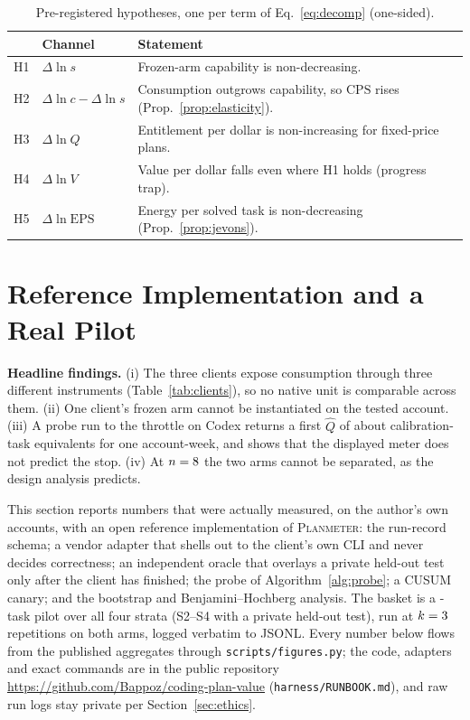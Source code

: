 \documentclass[conference]{IEEEtran}
\theoremstyle{plain}
\theoremstyle{definition}
\newcommand{\CPS}{\ensuremath{\mathrm{CPS}}}
\newcommand{\EPS}{\ensuremath{\mathrm{EPS}}}
\begin{document}
\begin{table}[t]
\caption{Pre-registered hypotheses, one per term of Eq.~\eqref{eq:decomp}
(one-sided).}
\label{tab:hyp}
\centering
\footnotesize
\begin{tabular}{@{}clp{4.35cm}@{}}
\toprule
& \textbf{Channel} & \textbf{Statement} \\
\midrule
H1 & $\Delta\ln s$ & Frozen-arm capability is non-decreasing. \\
H2 & $\Delta\ln c-\Delta\ln s$ & Consumption outgrows capability, so $\CPS$ rises (Prop.~\ref{prop:elasticity}). \\
H3 & $\Delta\ln Q$ & Entitlement per dollar is non-increasing for fixed-price plans. \\
H4 & $\Delta\ln V$ & Value per dollar falls even where H1 holds (progress trap). \\
H5 & $\Delta\ln\EPS$ & Energy per solved task is non-decreasing (Prop.~\ref{prop:jevons}). \\
\bottomrule
\end{tabular}
\end{table}

\section{Reference Implementation and a Real Pilot}
\label{sec:harness}

\textbf{Headline findings.} (i) The three clients expose consumption through
three different instruments (Table~\ref{tab:clients}), so no native unit is
comparable across them. (ii) One client's frozen arm cannot be instantiated on
the tested account. (iii) A probe run to the throttle on Codex returns a first
$\hat Q$ of about \codexProbeQ{} calibration-task equivalents for one
account-week, and shows that the displayed meter does not predict the stop.
(iv) At $n=8$ the two arms cannot be separated, as the design
analysis predicts.

This section reports numbers that were actually measured, on the author's
own accounts, with an open reference implementation of \textsc{Planmeter}: the
run-record schema; a vendor adapter that shells out to the client's own CLI and
never decides correctness; an independent oracle that overlays a private
held-out test only after the client has finished; the probe of
Algorithm~\ref{alg:probe}; a CUSUM canary; and the bootstrap and
Benjamini--Hochberg analysis. The basket is a \pilotNTasks{}-task pilot over all four
strata (S2--S4 with a private held-out test), run at $k=3$ repetitions
on both arms, logged verbatim to JSONL. Every number below flows from the
published aggregates through \texttt{scripts/figures.py}; the code, adapters
and exact commands are in the public repository
\url{https://github.com/Bappoz/coding-plan-value} (\texttt{harness/RUNBOOK.md}), and
raw run logs stay private per Section~\ref{sec:ethics}.
\end{document}

